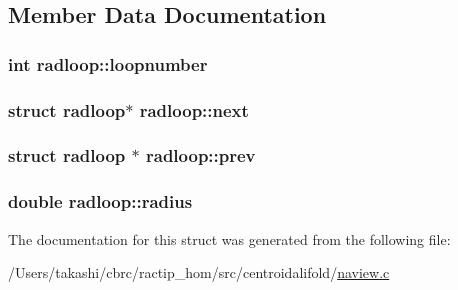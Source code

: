 \subsection{Member Data Documentation}
\hypertarget{structradloop_adefa8966693107c10ddee0d908eba5b0}{
\subsubsection[{loopnumber}]{\setlength{\rightskip}{0pt plus 5cm}int radloop\+::loopnumber}}\label{structradloop_adefa8966693107c10ddee0d908eba5b0}
\hypertarget{structradloop_a07f6e1a0e19e5a7e03a9e831e8300d37}{
\subsubsection[{next}]{\setlength{\rightskip}{0pt plus 5cm}struct {\bf radloop}$\ast$ radloop\+::next}}\label{structradloop_a07f6e1a0e19e5a7e03a9e831e8300d37}
\hypertarget{structradloop_acdcfc14a34e3316c6ecc01efcf5a8e46}{
\subsubsection[{prev}]{\setlength{\rightskip}{0pt plus 5cm}struct {\bf radloop} $\ast$ radloop\+::prev}}\label{structradloop_acdcfc14a34e3316c6ecc01efcf5a8e46}
\hypertarget{structradloop_ae48cb0dfffdc71d27f415e7cfa5c6686}{
\subsubsection[{radius}]{\setlength{\rightskip}{0pt plus 5cm}double radloop\+::radius}}\label{structradloop_ae48cb0dfffdc71d27f415e7cfa5c6686}


The documentation for this struct was generated from the following file\+:\begin{DoxyCompactItemize}
\item 
/\+Users/takashi/cbrc/ractip\+\_\+hom/src/centroidalifold/\hyperlink{naview_8c}{naview.\+c}\end{DoxyCompactItemize}
